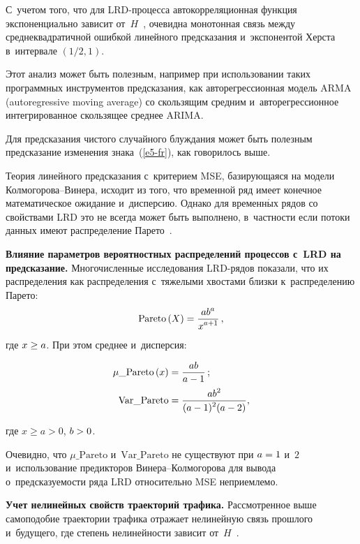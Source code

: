\begin{multicols}{2}
  С~учетом того, что для LRD-про\-цес\-са автокорреляционная функция 
экспоненциально зависит от~$H$~\cite{15-fr, 16-fr}, очевидна монотонная 
связь между среднеквадратичной ошибкой линейного предсказания 
и~экспонентой Херста в~интервале $(1/2, 1)$. 
  
  Этот анализ может быть полезным, например при использовании таких 
программных инструментов предсказания, как авторегрессионная модель 
ARMA (autoregressive moving average) со скользящим средним и~авторегрессионное интегрированное 
скользящее среднее \mbox{ARIMA}. 
{ %

}
  
  Для предсказания чистого случайного блуждания может быть полезным 
предсказание изменения знака~(\ref{e5-fr}), как говорилось выше. 
  
  Теория линейного предсказания с~критерием MSE, базирующаяся на 
модели Кол\-мо\-го\-ро\-ва--Ви\-не\-ра, исходит из того, что временной ряд 
имеет конечное математическое ожидание и~дисперсию. Однако для 
временн$\acute{\mbox{ы}}$х рядов со свойствами LRD это не всегда может быть выполнено, 
в~част\-ности если потоки данных имеют распределение Парето~\cite{21-fr}.

\smallskip
  
  \textbf{Влияние параметров вероятностных распределений процессов 
с~LRD на предсказание.} Мно\-го\-чис\-лен\-ные исследования LRD-рядов 
показали, что их распределения как распределения с~тяжелыми хвос\-та\-ми 
близки к~распределению Парето: 
$$
\mathrm{Pareto}\,(X)= \displaystyle\frac{\displaystyle ab^a\mathstrut}{\displaystyle x^{a+1}\mathstrut}\,,
$$ где 
$x\hm\geq a$. 
  При этом среднее и~дисперсия:
  
  \noindent
  \begin{align*}
  \mu\_\mathrm{Pareto}\,(x)&= \displaystyle\frac{\displaystyle ab\mathstrut}{\displaystyle a - 1\mathstrut}\,;\\
  \mathrm{Var}\_\mathrm{Pareto} &= \displaystyle\frac{\displaystyle ab^2\mathstrut}{\displaystyle (a - 1)^2 (a - 2)\mathstrut},
  \end{align*}
  
  \vspace*{-3pt}
  
  \noindent
где $x \geq a >0$, $b \hm> 0$.
  
  Очевидно, что $\mu\_\mathrm{Pareto}$ и~$\mathrm{Var}\_\mathrm{Pareto}$ не существуют при $a\hm = 1$ и~$2$ 
и~использование предикторов Ви\-не\-ра--Кол\-мо\-го\-ро\-ва для вывода 
о~пред\-ска\-зу\-емости ряда LRD относительно MSE неприемлемо. 

\smallskip
  
  \textbf{Учет нелинейных свойств траекторий трафика.} Рассмотренное 
выше самоподобие траектории трафика отражает нелинейную связь 
прошлого и~будущего, где степень нелинейности зависит  
от~$H$~\cite{14-fr, 16-fr, 2-fr}. 
  

\end{multicols}
